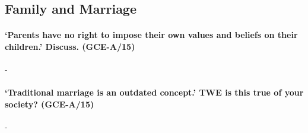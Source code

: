 \documentclass[../../main]{subfiles}
\begin{document}
\subsection{Family and Marriage}

\paragraph{`Parents have no right to impose their own values and beliefs on their children.' Discuss. (GCE-A/15)}-

\paragraph{`Traditional marriage is an outdated concept.' TWE is this true of your society? (GCE-A/15)}-
\end{document}
